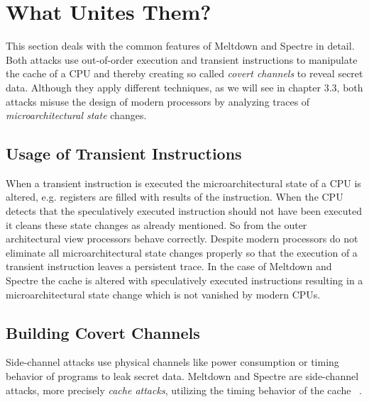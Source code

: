 \documentclass[a4paper,oneside,openright] {scrreprt}
\begin{document}
\section{What Unites Them?}
\label{ch:intro:motivation}

This section deals with the common features of Meltdown and Spectre in detail. 
Both attacks use out-of-order execution and transient instructions to manipulate the cache of a CPU and thereby
creating so called \textit{covert channels} to reveal secret data. Although they apply different techniques, 
as we will see in chapter 3.3, both attacks misuse the design of modern processors
by analyzing traces of \textit{microarchitectural state} changes. 

\subsection{Usage of Transient Instructions}
\label{ch:intro:motivation:A}

When a transient instruction is executed the microarchitectural state of a CPU is altered, e.g. registers are filled with results
of the instruction. When the CPU detects that the speculatively executed instruction should not have been executed it cleans these state
changes as already mentioned. So from the outer architectural view processors behave correctly. 
Despite modern processors do not eliminate all microarchitectural state changes properly so that the execution of a transient instruction
 leaves a persistent trace. In the case of Meltdown and Spectre the cache is altered with speculatively executed instructions resulting
 in a microarchitectural state change which is not vanished by modern CPUs.

 \subsection{Building Covert Channels}
\label{ch:intro:motivation:A}

Side-channel attacks use physical channels like power consumption or timing behavior of programs to
leak secret data. Meltdown and Spectre are side-channel attacks, more precisely \textit{cache attacks}, 
utilizing the timing behavior of the cache ~\cite{osvik2006cache}.
\end{document}
